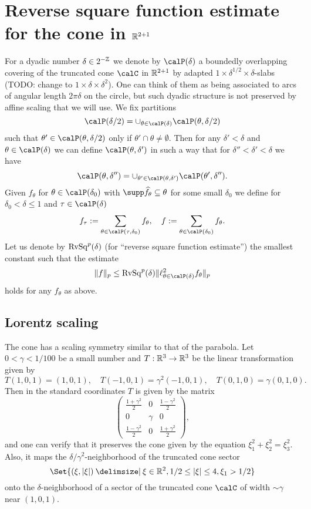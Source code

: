 \section{Reverse square function estimate for the cone in $\mathbb{R}^{2+1}$}

For a dyadic number $\delta\in 2^{-\mathbb{Z}}$ we denote by $\Part{\delta}$ a boundedly overlapping covering of the truncated cone $\calC$ in $\mathbb{R}^{2+1}$ by adapted $1 \times \delta^{1/2} \times \delta$-slabs (TODO: change to $1 \times \delta \times \delta^{2}$).
One can think of them as being associated to arcs of angular length $2\pi \delta$ on the circle, but such dyadic structure is not preserved by affine scaling that we will use.
We fix partitions
\[
\Part{\delta/2} = \cup_{\theta \in \Part{\delta}} \Part[\theta]{\delta/2}
\]
such that $\theta' \in \Part[\theta]{\delta/2}$ only if $\theta'\cap\theta\neq\emptyset$.
Then for any $\delta' < \delta$ and $\theta \in \Part{\delta}$ we can define $\Part[\theta]{\delta'}$ in such a way that for $\delta''<\delta'<\delta$ we have
\[
\Part[\theta]{\delta''} = \cup_{\theta' \in \Part[\theta]{\delta'}} \Part[\theta']{\delta''}.
\]
Given $f_{\theta}$ for $\theta \in \Part{\delta_{0}}$ with $\supp \widehat{f_{\theta}} \subseteq \theta$ for some small $\delta_{0}$ we define for $\delta_{0} < \delta \leq 1$ and $\tau\in\Part{\delta}$
\[
f_{\tau} := \sum_{\theta \in \Part[\tau]{\delta_{0}}} f_{\theta},
\quad
f := \sum_{\theta \in \Part{\delta_{0}}} f_{\theta}.
\]
Let us denote by $\mathrm{RvSq}^{p}(\delta)$ (for ``reverse square function estimate'') the smallest constant such that the estimate
\begin{equation}
\label{eq:RvSq:def}
\norm{f}_{p} \leq
\RvSq^{p}(\delta) \norm{ \ell^{2}_{\theta \in \Part{\delta}} f_{\theta} }_{p}
\end{equation}
holds for any $f_{\theta}$ as above.

\subsection{Lorentz scaling}
The cone has a scaling symmetry similar to that of the parabola.
Let $0<\gamma<1/100$ be a small number and $T : \mathbb{R}^3 \to \mathbb{R}^3$ be the linear transformation given by
\[
T(1,0,1) = (1,0,1),
\quad T(-1,0,1) = \gamma^{2}(-1,0,1),
\quad T(0,1,0) = \gamma(0,1,0).
\]
Then in the standard coordinates $T$ is given by the matrix
\[
\begin{pmatrix}
\frac{1+\gamma^{2}}{2} & 0 & \frac{1-\gamma^{2}}{2}\\
0 & \gamma & 0\\
\frac{1-\gamma^{2}}{2} & 0 & \frac{1+\gamma^{2}}{2}
\end{pmatrix},
\]
and one can verify that it preserves the cone given by the equation $\xi_{1}^{2}+\xi_{2}^{2}=\xi_{3}^{2}$.
Also, it maps the $\delta/\gamma^{2}$-neighborhood of the truncated cone sector
\[
\Set{ (\xi,\abs{\xi} ) \given \xi\in\R^{2}, 1/2 \leq \abs{\xi} \leq 4, \xi_{1}>1/2 }
\]
onto the $\delta$-neighborhood of a sector of the truncated cone $\calC$ of width $\sim\gamma$ near $(1,0,1)$.

